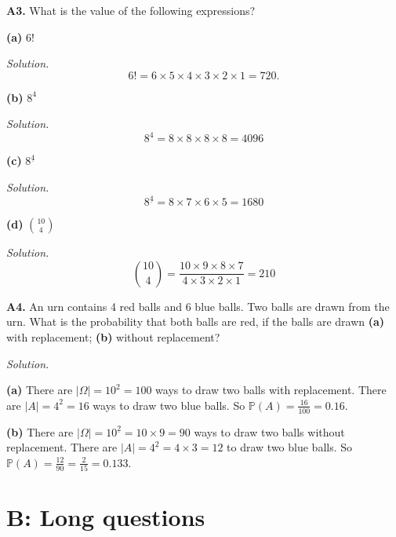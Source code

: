 \documentclass[
  a4paper,
]{book}
\theoremstyle{definition}
\theoremstyle{definition}
\theoremstyle{definition}
\theoremstyle{definition}
\theoremstyle{remark}
\begin{document}
\textbf{A3.} What is the value of the following expressions?

\textbf{(a)} \(6!\)

\begin{myanswers}
\emph{Solution.}
\[ 6! = 6 \times 5 \times 4 \times 3 \times 2 \times 1 = 720. \]

\end{myanswers}

\textbf{(b)} \(8^4\)

\begin{myanswers}
\emph{Solution.}
\[ 8^4 = 8 \times 8 \times 8 \times 8 = 4096 \]

\end{myanswers}

\textbf{(c)} \({8}^{\underline{4}}\)

\begin{myanswers}
\emph{Solution.}
\[ {8}^{\underline{4}} = 8 \times 7 \times 6 \times 5 = 1680 \]

\end{myanswers}

\textbf{(d)} \({\displaystyle \binom{10}{4}}\)

\begin{myanswers}
\emph{Solution.}
\[ \binom{10}{4} = \frac{10 \times 9 \times 8 \times 7}{4\times 3\times 2\times 1} = 210 \]

\end{myanswers}

\textbf{A4.} An urn contains 4 red balls and 6 blue balls. Two balls are drawn from the urn. What is the probability that both balls are red, if the balls are drawn \textbf{(a)} with replacement; \textbf{(b)} without replacement?

\begin{myanswers}
\emph{Solution.}

\textbf{(a)} There are \(|\Omega| = 10^2 = 100\) ways to draw two balls with replacement. There are \(|A| = 4^2=16\) ways to draw two blue balls. So
\(\mathbb P(A) = \frac{16}{100} = 0.16\).

\textbf{(b)} There are \(|\Omega| = {10}^{\underline{2}} = 10 \times 9 = 90\) ways to draw two balls without replacement. There are \(|A| = {4}^{\underline{2}} = 4 \times 3 = 12\) to draw two blue balls. So
\(\mathbb P(A) = \frac{12}{90} = \frac{2}{15} = 0.133\).

\end{myanswers}

\hypertarget{P2-long}{%
\section*{B: Long questions}\label{P2-long}}
\end{document}
